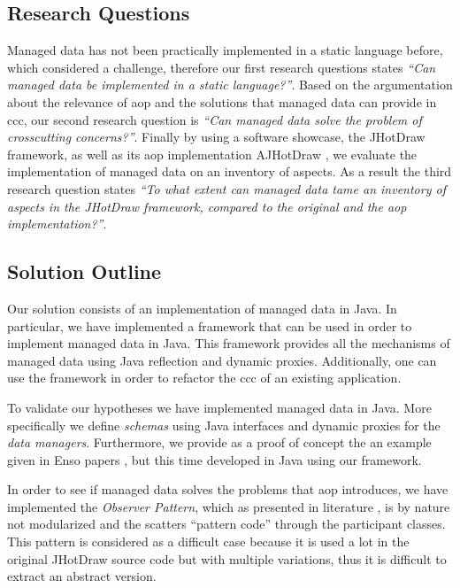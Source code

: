 \subsection{Research Questions}\label{Research Questions}
Managed data has not been practically implemented in a static language before, which considered a challenge, therefore our first research questions states 
\textit{``Can managed data be implemented in a static language?''}.
Based on the argumentation about the relevance of \ac{aop} and the solutions that managed data can provide in \acrlong{ccc}, our second research question is \textit{``Can managed data solve the problem of crosscutting concerns?''}. 
Finally by using a software showcase, the JHotDraw framework, as well as its \ac{aop} implementation AJHotDraw \cite{marinajhotdraw}, 
we evaluate the implementation of managed data on an inventory of aspects. 
As a result the third research question states \textit{``To what extent can managed data tame an inventory of aspects in the JHotDraw framework, compared to the original and the \ac{aop} implementation?''}.

\subsection{Solution Outline}\label{Solution Outline}
Our solution consists of an implementation of managed data in Java.
In particular, we have implemented a framework that can be used in order to implement managed data in Java.
This framework provides all the mechanisms of managed data using Java reflection and dynamic proxies. Additionally, one can use the framework in order to refactor the \ac{ccc} of an existing application.

To validate our hypotheses we have implemented managed data in Java.
More specifically we define \textit{schemas} using Java interfaces and dynamic proxies for the \textit{data managers}. 
Furthermore, we provide as a proof of concept the an example given in Enso papers \cite{loh2012managed}, but this time developed in Java using our framework. 

In order to see if managed data solves the problems that \ac{aop} introduces, we have implemented the \textit{Observer Pattern}, which as presented in literature \cite{tourwe2003existence} \cite{hannemann2005role} \cite{marin2005approach}, is by nature not modularized and the scatters ``pattern code'' through the participant classes. 
This pattern is considered as a difficult case because it is used a lot in the original JHotDraw source code but with multiple variations, thus it is difficult to extract an abstract version.

